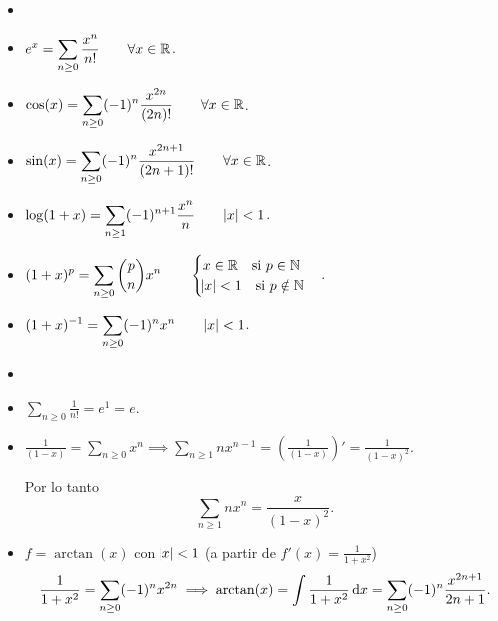 \begin{prop}
    \begin{itemize}
        \item[]
        \item $\displaystyle e^x = \sum_{n \geq 0} \frac{x^n}{n!}
            \qquad \forall x \in \mathbb{R}$.
        \item $\displaystyle \cos(x) = \sum_{n \geq 0} (-1)^{n}\frac{x^{2n}}{(2n)!}
            \qquad \forall x \in \mathbb{R}$.
        \item $\displaystyle \sin(x) = \sum_{n \geq 0} (-1)^{n}\frac{x^{2n+1}}{(2n+1)!}
            \qquad \forall x \in \mathbb{R}$.
        \item $\displaystyle \log(1+x) = \sum_{n \geq 1} (-1)^{n+1} \frac{x^n}{n}
            \qquad \abs{x} < 1$.
        \item $\displaystyle (1+x)^p = \sum_{n \geq 0} {p \choose n} x^n \qquad
            \begin{cases} x \in \mathbb{R} \quad \text{si } p \in \mathbb{N} \\ \abs{x} < 1
            \quad \text{si } p \notin \mathbb{N} \end{cases}$.
        \item $\displaystyle (1+x)^{-1} = \sum_{n \geq 0} (-1)^n x^n \qquad \abs{x} < 1$.
    \end{itemize}
\end{prop}

\begin{example}
    \begin{itemize}
        \item[]
        \item $\displaystyle \sum_{n \geq 0} \frac{1}{n!} = e^1 = e$.
        \item $\displaystyle \frac{1}{(1-x)} = \sum_{n \geq 0} x^n \implies
            \sum_{n \geq 1} n x^{n-1} = \left( \frac{1}{(1-x)} \right)' =
            \frac{1}{(1-x)^2}$.

            Por lo tanto
            \[
                \sum_{n \geq 1} nx^n = \frac{x}{(1-x)^2}.
            \]
        \item $f = \arctan(x)$ con $\abs{x} < 1$ (a partir de $f'(x) = \frac{1}{1+x^2}$)
            \[
                \frac{1}{1+x^2} = \sum_{n \geq 0} (-1)^n x^{2n} \implies
                \arctan(x) = \int \frac{1}{1+x^2} \dif x = \sum_{n \geq 0} (-1)^n
                \frac{x^{2n+1}}{2n+1}.
            \]
    \end{itemize}
\end{example}

